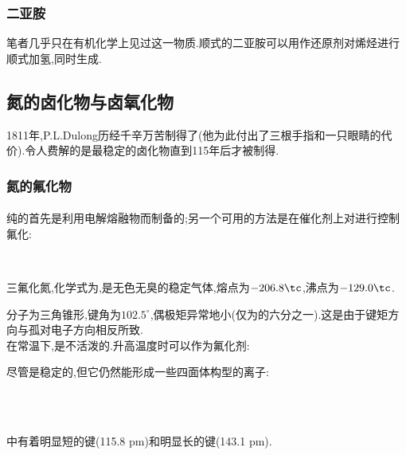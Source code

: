 \documentclass{ctexart}
\begin{document}
\subsubsection{二亚胺}
笔者几乎只在有机化学上见过这一物质.顺式的二亚胺可以用作还原剂对烯烃进行顺式加氢,同时生成.
\subsection{氮的卤化物与卤氧化物}
1811年,P.L.Dulong历经千辛万苦制得了(他为此付出了三根手指和一只眼睛的代价).令人费解的是最稳定的卤化物直到115年后才被制得.
\subsubsection{氮的氟化物}
\paragraph{}
纯的首先是利用电解熔融物而制备的;另一个可用的方法是在催化剂上对进行控制氟化:
\begin{center}
    \\
\end{center}
\begin{substance}[\ce{NF3}]
    三氟化氮,化学式为,是无色无臭的稳定气体,熔点为$-206.8\tc$,沸点为$-129.0\tc$.
\end{substance}
\indent{}分子为三角锥形,键角为$102.5^\circ$,偶极矩异常地小(仅为的六分之一).这是由于键矩方向与孤对电子方向相反所致.\\
\indent 在常温下,是不活泼的.升高温度时可以作为氟化剂:
\begin{center}
\end{center}
尽管是稳定的,但它仍然能形成一些四面体构型的离子:
\begin{center}
    \\
    \\
\end{center}
中有着明显短的键(115.8 pm)和明显长的键(143.1 pm).
\end{document}
